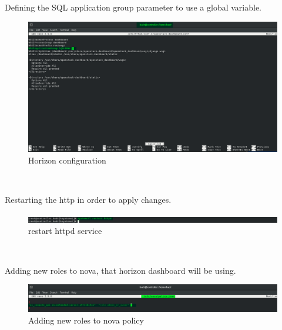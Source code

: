 \begin{spacing}{1.2}
\par Defining the SQL application group parameter to use a global variable.
\\
\begin{figure}[!htb] 
\begin{center} 
\includegraphics[width=1\linewidth]{Cloud/Configure Horizon/C_3_conf_5.png} 
\end{center} 
\caption{ Horizon configuration} 
\end{figure} 
\FloatBarrier
\\

\par Restarting the http in order to apply changes.
\\
\begin{figure}[!htb] 
\begin{center} 
\includegraphics[width=1\linewidth]{Cloud/Configure Horizon/C_4.png} 
\end{center} 
\caption{ restart httpd service} 
\end{figure} 
\FloatBarrier
\\

\par Adding new roles to nova, that horizon dashboard will be using.
\\
\begin{figure}[!htb] 
\begin{center} 
\includegraphics[width=1\linewidth]{Cloud/Configure Horizon/C_5.png} 
\end{center} 
\caption{ Adding new roles to nova policy} 
\end{figure} 
\FloatBarrier
\\


\end{spacing}

